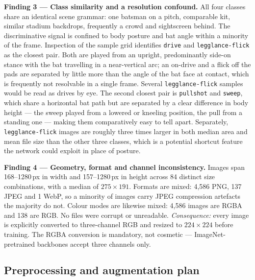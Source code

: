 \documentclass[11pt,a4paper]{article}
\begin{document}
\textbf{Finding 3 --- Class similarity and a resolution confound.} All four classes
share an identical scene grammar: one batsman on a pitch, comparable kit, similar
stadium backdrops, frequently a crowd and sightscreen behind. The discriminative signal
is confined to body posture and bat angle within a minority of the frame. Inspection of the
sample grid identifies \texttt{drive} and \texttt{legglance-flick} as the closest pair.
Both are played from an upright, predominantly side-on stance with the bat travelling in
a near-vertical arc; an on-drive and a flick off the pads are separated by little more
than the angle of the bat face at contact, which is frequently not resolvable in a single
frame. Several \texttt{legglance-flick} samples would be read as drives by eye. The
second closest pair is \texttt{pullshot} and \texttt{sweep}, which share a horizontal
bat path but are separated by a clear difference in body height --- the sweep played from
a lowered or kneeling position, the pull from a standing one --- making them
comparatively easy to tell apart.
Separately, \texttt{legglance-flick} images are roughly three times larger in both
median area and mean file size than the other three classes, which is a potential
shortcut feature the network could exploit in place of posture.

\textbf{Finding 4 --- Geometry, format and channel inconsistency.} Images span
168--1280\,px in width and 157--1280\,px in height across 84 distinct size combinations,
with a median of $275 \times 191$. Formats are mixed: 4{,}586 PNG, 137 JPEG and 1 WebP,
so a minority of images carry JPEG compression artefacts the majority do not. Colour
modes are likewise mixed: 4{,}586 images are RGBA and 138 are RGB. No files were corrupt
or unreadable. \emph{Consequence:} every image is explicitly converted to three-channel
RGB and resized to $224 \times 224$ before training. The RGBA conversion is mandatory,
not cosmetic --- ImageNet-pretrained backbones accept three channels only.

\subsection{Preprocessing and augmentation plan}
\label{sec:prep}
\end{document}
